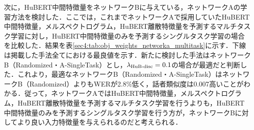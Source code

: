 \begin{table}[b]
    \centering
    \caption{HuBERT Transformerへの入力特徴量を変化させた場合の比較}
    \label{sec4:tab:obj_weights_networkb_input_comparison}
    \begin{center}
        \renewcommand{\arraystretch}{1.0} %
        \setlength{\tabcolsep}{8pt}      %
    \end{center}
\end{table}

次に，HuBERT中間特徴量をネットワークBに与えている，ネットワークAの学習方法を検討した．ここでは，これまでネットワークAで採用していたHuBERT中間特徴量，メルスペクトログラム，HuBERT離散特徴量を予測するマルチタスク学習に対し，HuBERT中間特徴量のみを予測するシングルタスク学習の場合を比較した．結果を表\ref{sec4:tab:obj_weights_networka_multitask}に示す．下線は掲載した手法全てにおける最良値を示す．新たに検討した手法はネットワークB（Randomized・A-SingleTask）とし，$\lambda_{\text{HuB-disc}} = 0.1$の場合が最適だと判断した．これより，最適なネットワークB（Randomized・A-SingleTask）はネットワークB（Randomized）よりもWERが2.8\%低く，話者類似度は0.007高いことがわかる．従って，ネットワークAではHuBERT中間特徴量，メルスペクトログラム，HuBERT離散特徴量を予測するマルチタスク学習を行うよりも，HuBERT中間特徴量のみを予測するシングルタスク学習を行う方が，ネットワークBに対してより良い入力特徴量を与えられるのだと考えられる．

